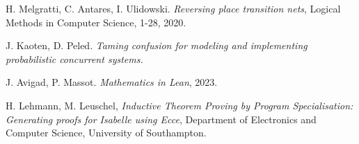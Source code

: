 \documentclass{article}
\begin{document}
\begin{thebibliography}{9}

  H. Melgratti, C. Antares, I. Ulidowski.
  \textit{Reversing place transition nets},
  Logical Methods in Computer Science,
  1-28,
  2020.

 J. Kaoten, D. Peled.
  \textit{Taming confusion for modeling and implementing probabilistic concurrent systems.}

J. Avigad, P. Massot.
 \textit{Mathematics in Lean},
 2023.

H. Lehmann, M. Leuschel,
\textit{Inductive Theorem Proving by Program Specialisation:
Generating proofs for Isabelle using Ecce},
Department of Electronics and Computer Science,
University of Southampton.

\end{thebibliography}
\end{document}
